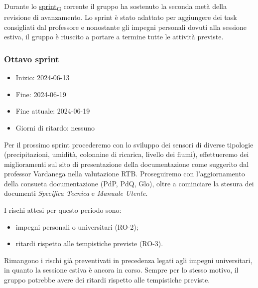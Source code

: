 Durante lo \href{https://7last.github.io/docs/rtb/documentazione-interna/glossario\#sprint}{sprint\textsubscript{G}} corrente il gruppo ha sostenuto la seconda metà della revisione di avanzamento. Lo sprint è stato adattato per aggiungere dei task consigliati dal professore e nonostante gli impegni personali dovuti alla sessione estiva, il gruppo è riuscito a portare a termine tutte le attività previste.



\newpage
\subsubsection{Ottavo sprint}
\begin{itemize}
	\item Inizio: 2024-06-13
	\item Fine: 2024-06-19
	\item Fine attuale: 2024-06-19
	\item Giorni di ritardo: nessuno
\end{itemize}

Per il prossimo sprint procederemo con lo sviluppo dei sensori di diverse tipologie (precipitazioni, umidità, colonnine di ricarica, livello dei fiumi), effettueremo dei miglioramenti sul sito di presentazione della documentazione come suggerito dal professor Vardanega nella valutazione RTB. Proseguiremo con l'aggiornamento della consueta documentazione (PdP, PdQ, Glo), oltre a cominciare la stesura dei documenti \textit{Specifica Tecnica} e \textit{Manuale Utente}.

I rischi attesi per questo periodo sono:
\begin{itemize}
	\item impegni personali o universitari (RO-2);
	\item ritardi rispetto alle tempistiche previste (RO-3).
\end{itemize}
Rimangono i rischi già preventivati in precedenza legati agli impegni universitari, in quanto la sessione estiva è ancora in corso. Sempre per lo stesso motivo, il gruppo potrebbe avere dei ritardi rispetto alle tempistiche previste.

